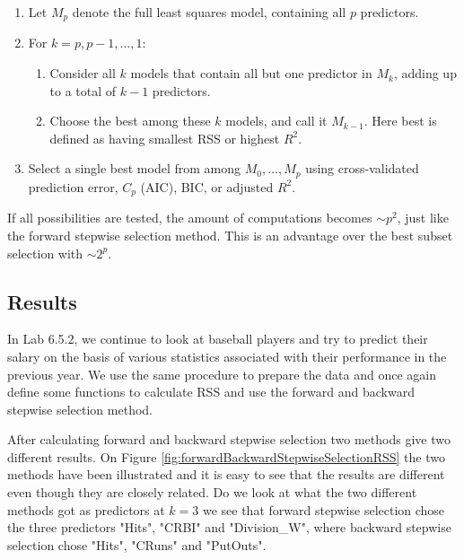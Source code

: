 \begin{enumerate}
	\item Let $M_p$ denote the full least squares model, containing all $p$ predictors.
	\item For $k=p,p-1,\dots,1$:
	\begin{enumerate}
		\item Consider all $k$ models that contain all but one predictor in $M_k$, adding up to a total of $k-1$ predictors.
		\item Choose the best among these $k$ models, and call it $M_{k-1}$. Here best is defined as having smallest RSS or highest $R^2$.
	\end{enumerate}
	\item Select a single best model from among $M_0,\dots,M_p$ using cross-validated prediction error, $C_p$ (AIC), BIC, or adjusted $R^2$. 
\end{enumerate}

If all possibilities are tested, the amount of computations becomes $\sim p^2$, just like the forward stepwise selection method. This is an advantage over the best subset selection with $\sim 2^p$.

\subsection{Results}
In Lab 6.5.2, we continue to look at baseball players and try to predict their salary on the basis of various statistics associated with their performance in the previous year. We use the same procedure to prepare the data and once again define some functions to calculate RSS and use the forward and backward stepwise selection method.

After calculating forward and backward stepwise selection two methods give two different results. On Figure \ref{fig:forwardBackwardStepwiseSelectionRSS} the two methods have been illustrated and it is easy to see that the results are different even though they are closely related. Do we look at what the two different methods got as predictors at $k=3$ we see that forward stepwise selection chose the three predictors "Hits", "CRBI" and "Division\_W", where backward stepwise selection chose "Hits", "CRuns" and "PutOuts".

